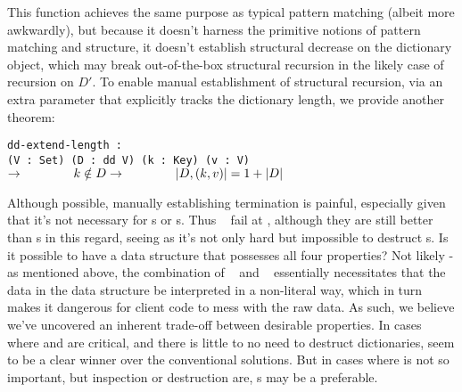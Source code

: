 This function achieves the same purpose as typical pattern matching (albeit more awkwardly), but because it
doesn't harness the primitive notions of pattern matching and structure, it doesn't establish structural
decrease on the dictionary object, which may break out-of-the-box structural recursion in the likely case
of recursion on $D'$. To enable manual establishment of structural recursion, via an extra parameter that
explicitly tracks the dictionary length, we provide another theorem:

\texttt{dd-extend-length :\\
\phantom{xxxxx} (V : Set) (D : dd V) (k : Key) (v : V) $\rightarrow \\
\phantom{xxxxxxx} k \notin D \rightarrow \\
\phantom{xxxxxxx} |D, (k, v)| = 1 + |D|$}

Although possible, manually establishing termination is painful, especially given that it's not necessary
for {\sal}s or {\cal}s. Thus \dds~ fail at \EzDstr, although they are still better than {\fpf}s in this
regard, seeing as it's not only hard but impossible to destruct {\fpf}s. Is it possible to have a data
structure that possesses all four properties? Not likely - as mentioned above, the combination of
\SemInj~ and \SemTot~ essentially
necessitates that the data in the data structure be interpreted in a non-literal way, which in turn
makes it dangerous for client code to mess with the raw data. As such, we believe we've uncovered an
inherent trade-off between desirable properties. In cases where \SemTot{} and \EqDec{} are critical,
and there is little to no need to destruct dictionaries, \dds{} seem to be a clear winner over
the conventional solutions. But in cases where \SemTot{} is not so important,
but inspection or destruction are, {\CAL}s may be a preferable.
